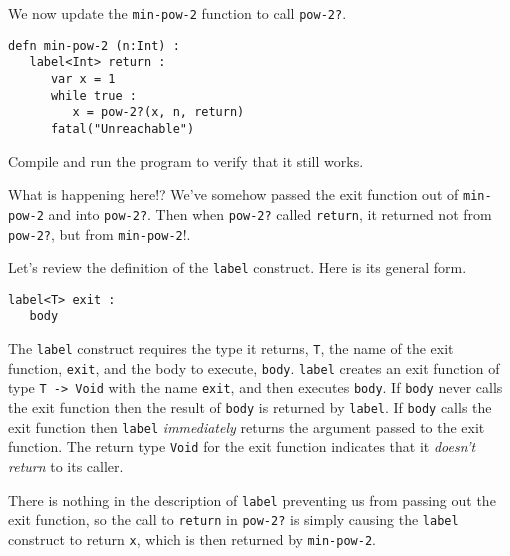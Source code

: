 \documentclass[10pt,oneside]{book}
\begin{document}
We now update the \texttt{\frenchspacing min-pow-2} function to call \texttt{\frenchspacing pow-2?}.
\begin{lstlisting}
defn min-pow-2 (n:Int) :
   label<Int> return :
      var x = 1
      while true :
         x = pow-2?(x, n, return)
      fatal("Unreachable")
\end{lstlisting}
Compile and run the program to verify that it still works.

What is happening here!? We've somehow passed the exit function out of \texttt{\frenchspacing min-pow-2} and into \texttt{\frenchspacing pow-2?}. Then when \texttt{\frenchspacing pow-2?} called \texttt{\frenchspacing return}, it returned not from \texttt{\frenchspacing pow-2?}, but from \texttt{\frenchspacing min-pow-2}!.

Let's review the definition of the \texttt{\frenchspacing label} construct. Here is its general form.
\begin{lstlisting}
label<T> exit :
   body
\end{lstlisting}
The \texttt{\frenchspacing label} construct requires the type it returns, \texttt{\frenchspacing T}, the name of the exit function, \texttt{\frenchspacing exit}, and the body to execute, \texttt{\frenchspacing body}. \texttt{\frenchspacing label} creates an exit function of type \texttt{\frenchspacing T -> Void} with the name \texttt{\frenchspacing exit}, and then executes \texttt{\frenchspacing body}. If \texttt{\frenchspacing body} never calls the exit function then the result of \texttt{\frenchspacing body} is returned by \texttt{\frenchspacing label}. If \texttt{\frenchspacing body} calls the exit function then \texttt{\frenchspacing label} {\em immediately} returns the argument passed to the exit function. The return type \texttt{\frenchspacing Void} for the exit function indicates that it {\em doesn't return} to its caller.

There is nothing in the description of \texttt{\frenchspacing label} preventing us from passing out the exit function, so the call to \texttt{\frenchspacing return} in \texttt{\frenchspacing pow-2?} is simply causing the \texttt{\frenchspacing label} construct to return \texttt{\frenchspacing x}, which is then returned by \texttt{\frenchspacing min-pow-2}.
\end{document}
